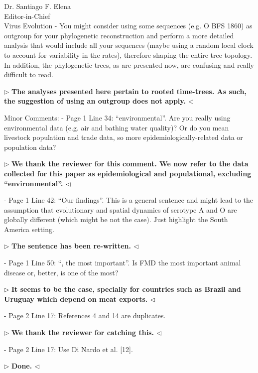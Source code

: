 \documentclass[12pt, a4paper]{letter} %
\newenvironment{reply}{$\triangleright$\bf}{$\triangleleft$}
\begin{document}
\begin{letter}{
	Dr. Santiago F. Elena\\
    Editor-in-Chief \\
    Virus Evolution
}
-       You might consider using some sequences (e.g. O BFS 1860) as outgroup for your phylogenetic reconstruction and perform a more detailed analysis that would include all your sequences (maybe using a random local clock to account for variability in the rates), therefore shaping the entire tree topology. 
In addition, the phylogenetic trees, as are presented now, are confusing and really difficult to read.

\begin{reply}
The analyses presented here pertain to rooted time-trees. 
As such, the suggestion of using an outgroup does not apply.
\end{reply}

Minor Comments:
-       Page 1 Line 34: ``environmental''. 
Are you really using environmental data (e.g. air and bathing water quality)? 
Or do you mean livestock population and trade data, so more epidemiologically-related data or population data?

\begin{reply}
We thank the reviewer for this comment.
We now  refer to the data collected for this paper as epidemiological and populational, excluding ``environmental''.
\end{reply}

-       Page 1 Line 42: ``Our findings''. 
This is a general sentence and might lead to the assumption that evolutionary and spatial dynamics of serotype A and O are globally different (which might be not the case). 
Just highlight the South America setting.

\begin{reply}
The sentence has been re-written.
\end{reply}

-       Page 1 Line 50: ``, the most important''. 
Is FMD the most important animal disease or, better, is one of the most?

\begin{reply}
It seems to be the case, specially for countries such as Brazil and Uruguay which depend on meat exports.
\end{reply}

-       Page 2 Line 17: References 4 and 14 are duplicates.

\begin{reply}
We thank the reviewer for catching this.
\end{reply}

-       Page 2 Line 17: Use Di Nardo et al. [12].

\begin{reply}
Done.
\end{reply}


\end{letter}
\end{document}
